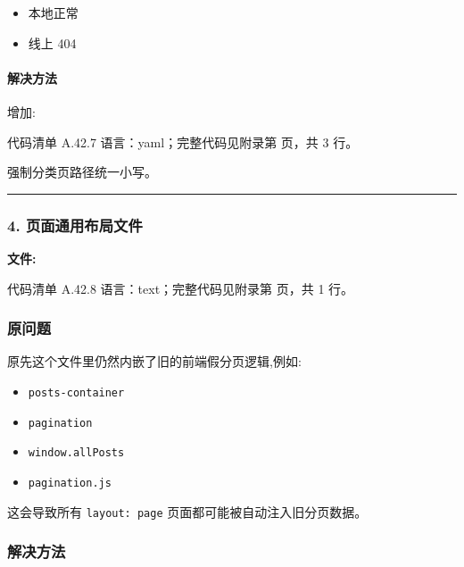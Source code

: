\documentclass[lang=cn,scheme=chinese,color=blue,device=normal,toc=onecol,math=cm]{elegantbook}
\begin{document}
\begin{itemize}
\item 本地正常
\item 线上 404
\end{itemize}


\paragraph{解决方法}


增加:\par


\begin{codeindexbox}{代码清单 A.42.7}
语言：yaml；完整代码见附录第 \pageref{code:42:7} 页，共 3 行。
\end{codeindexbox}


强制分类页路径统一小写。\par


\medskip\hrule\medskip


\subsubsection{4. 页面通用布局文件}


\textbf{文件:}\par


\begin{codeindexbox}{代码清单 A.42.8}
语言：text；完整代码见附录第 \pageref{code:42:8} 页，共 1 行。
\end{codeindexbox}


\subsubsection{原问题}


原先这个文件里仍然内嵌了旧的前端假分页逻辑,例如:\par


\begin{itemize}
\item \texttt{posts-container}
\item \texttt{pagination}
\item \texttt{window.allPosts}
\item \texttt{pagination.js}
\end{itemize}


这会导致所有 \texttt{layout: page} 页面都可能被自动注入旧分页数据。\par


\subsubsection{解决方法}
\end{document}
